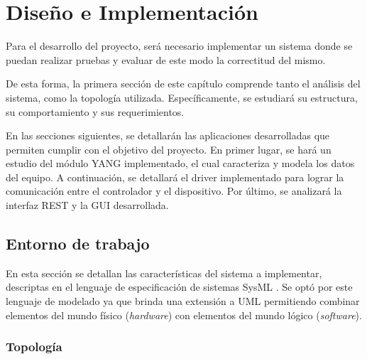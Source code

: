 
\chapter{Diseño e Implementación} %

\label{Chapter4} %
Para el desarrollo del proyecto, será necesario implementar un sistema donde se puedan realizar pruebas y evaluar de este modo la correctitud del mismo. 

De esta forma, la primera sección de este capítulo comprende tanto el análisis del sistema, como la topología utilizada. Específicamente, se estudiará su estructura, su comportamiento y sus requerimientos. 

En las secciones siguientes, se detallarán las aplicaciones desarrolladas que permiten cumplir con el objetivo del proyecto. En primer lugar, se hará un estudio del módulo YANG implementado, el cual caracteriza y modela los datos del equipo. A continuación, se detallará el driver implementado para lograr la comunicación entre el controlador y el dispositivo. Por último, se analizará la interfaz REST y la GUI desarrollada.


\section{Entorno de trabajo}
En esta sección se detallan las características del sistema a implementar, descriptas en el lenguaje de especificación de sistemas SysML \parencite{sysml}. Se optó por este lenguaje de modelado ya que brinda una extensión a UML permitiendo combinar elementos del mundo físico (\textit{hardware}) con elementos del mundo lógico (\textit{software}). 


\subsection{Topología}

